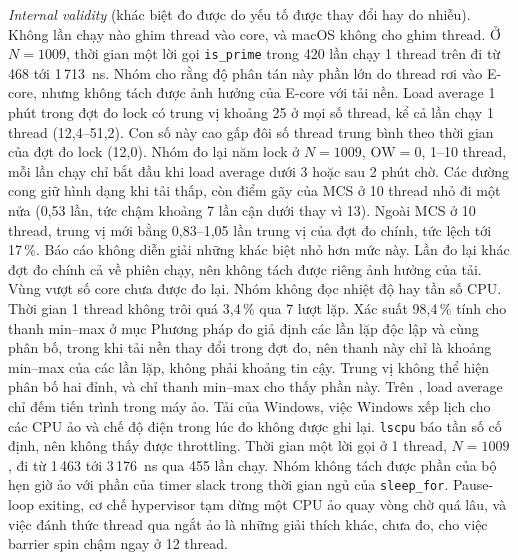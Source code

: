 \emph{Internal validity} (khác biệt đo được do yếu tố được thay đổi hay do nhiễu). Không lần chạy nào ghim thread vào core, và macOS không cho ghim thread. Ở
$N=1009$, thời gian một lời gọi \texttt{is\_prime} trong 420 lần chạy 1 thread trên  đi
từ 468 tới 1\,713~ns. Nhóm cho rằng độ phân tán này phần lớn do thread rơi vào E-core, nhưng không tách
được ảnh hưởng của E-core với tải nền. Load average 1 phút trong đợt đo lock có trung vị khoảng 25 ở mọi
số thread, kể cả lần chạy 1 thread (12,4--51,2). Con số này cao gấp đôi số thread trung bình theo thời
gian của đợt đo lock (12,0).
Nhóm đo lại năm lock ở $N = 1009$, $\mathrm{OW} = 0$, 1--10 thread, mỗi lần chạy chỉ bắt đầu khi load
average dưới 3 hoặc sau 2 phút chờ. Các đường cong giữ hình dạng khi tải thấp, còn điểm gãy của MCS ở 10
thread nhỏ đi một nửa (0,53 lần, tức chậm khoảng 7 lần cận dưới thay vì 13). Ngoài MCS ở 10 thread,
trung vị mới bằng 0,83--1,05 lần trung vị của đợt đo chính, tức lệch tới 17\,\%. Báo cáo không diễn giải
những khác biệt nhỏ hơn mức này. Lần đo lại khác đợt đo chính cả về phiên chạy, nên không tách được riêng
ảnh hưởng của tải. Vùng vượt số core chưa được đo lại.
Nhóm không đọc nhiệt độ hay tần số CPU. Thời gian 1 thread không trôi quá 3,4\,\% qua 7 lượt lặp.
Xác suất 98,4\,\% tính cho thanh min--max ở mục Phương pháp đo giả định các lần lặp độc lập và cùng
phân bố, trong khi tải nền thay đổi trong đợt đo, nên thanh này chỉ là khoảng min--max của các lần lặp,
không phải khoảng tin cậy. Trung vị không thể hiện phân bố hai đỉnh, và chỉ thanh min--max cho thấy phần
này.
Trên , load average chỉ đếm tiến trình trong máy ảo. Tải của Windows, việc Windows xếp
lịch cho các CPU ảo và chế độ điện trong lúc đo không được ghi lại. \texttt{lscpu} báo tần số cố định,
nên không thấy được throttling. Thời gian một lời gọi ở 1 thread, $N=1009$, đi từ 1\,463 tới 3\,176~ns
qua 455 lần chạy. Nhóm không tách được phần của bộ hẹn giờ ảo với phần của timer slack trong thời gian
ngủ của \texttt{sleep\_for}. Pause-loop exiting, cơ chế hypervisor tạm dừng một CPU ảo quay vòng chờ quá
lâu, và việc đánh thức thread qua ngắt ảo là những giải thích khác, chưa đo, cho việc barrier spin chậm
ngay ở 12 thread.

